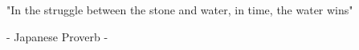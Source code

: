 \text{ }
\vspace{5cm}

\begin{center}\bfseries



"In the struggle between the stone and water, in time, the water wins"

\mdseries

- Japanese Proverb -

\end{center}
